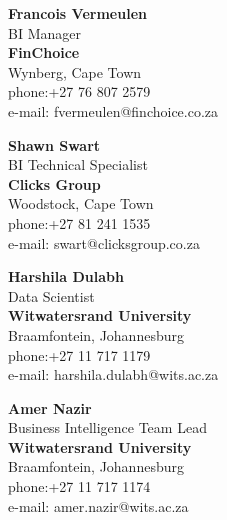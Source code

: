 


\begin{cventries}


\cventry
{} %
{} %
{} %
{} %
{ %
\begin{cvitems}
\item{
\textbf{Francois Vermeulen}\\
BI Manager \\
\textbf{FinChoice } \\
Wynberg, Cape Town          \\
phone:+27 76 807 2579   \\
e-mail: fvermeulen@finchoice.co.za    \\}
\item{
	\textbf{Shawn Swart}\\
	BI Technical Specialist \\
	\textbf{Clicks Group } \\
	Woodstock, Cape Town          \\
	phone:+27 81 241 1535    \\
	e-mail: swart@clicksgroup.co.za     \\}
\item{
	\textbf{Harshila Dulabh}\\
Data Scientist \\
	\textbf{Witwatersrand University} \\
	Braamfontein, Johannesburg    \\
	phone:+27 11 717 1179     \\
	e-mail: harshila.dulabh@wits.ac.za   \\}
\item{
	\textbf{Amer Nazir}\\
	Business Intelligence Team Lead \\
	\textbf{Witwatersrand University} \\
	Braamfontein, Johannesburg    \\
	phone:+27 11 717 1174         \\
	e-mail: amer.nazir@wits.ac.za    \\}
\end{cvitems}
}


\end{cventries}